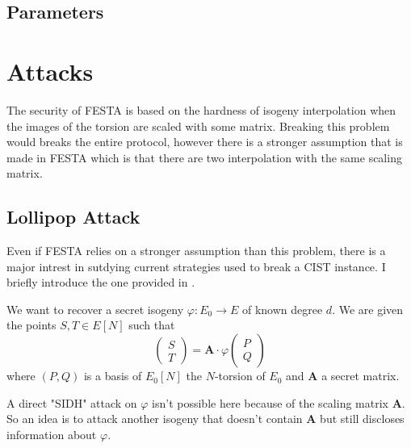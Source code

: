 \documentclass[12pt,a4paper]{article}
\begin{document}
		\subsection{Parameters}


		\section{Attacks}
		The security of FESTA is based on the hardness of isogeny interpolation when the
		images of the torsion are scaled with some matrix. Breaking this problem would breaks
		the entire protocol, however there is a stronger assumption that is made in FESTA which
		is that there are two interpolation with the same scaling matrix.


		\subsection{Lollipop Attack}
		Even if FESTA relies on a stronger assumption than this problem, there is a major intrest
		in sutdying current strategies used to break a CIST instance. I briefly introduce
		the one provided in \cite{polyCIST}.

		We want to recover a secret isogeny $\varphi:E_0\to E$ of known degree $d$. We are given
		the points $S,T\in E[N]$ such that
		\[
			\begin{pmatrix} S \\ T \end{pmatrix} = \mathbf A\cdot \varphi \begin{pmatrix} P \\ Q \end{pmatrix}
		\] 
		where $(P,Q)$ is a basis of  $E_0[N]$ the $N$-torsion of $E_0$ and  $\mathbf A$ a secret
		matrix.


		A direct "SIDH" attack on $\varphi$ isn't possible here because of the scaling matrix
		$\mathbf A$. So an idea is to attack another isogeny that doesn't contain $\mathbf A$
		but still discloses information about $\varphi$.
\end{document}
